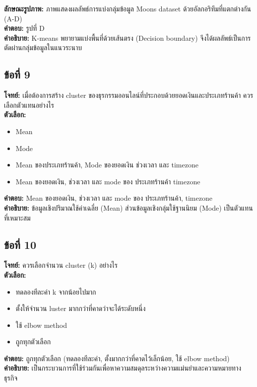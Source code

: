 \documentclass[12pt]{article}
\begin{document}
\textbf{ลักษณะรูปภาพ:} ภาพแสดงผลลัพธ์การแบ่งกลุ่มข้อมูล Moons dataset ด้วยอัลกอริทึมที่แตกต่างกัน (A-D)\\
\textbf{คำตอบ:} รูปที่ D\\
\textbf{คำอธิบาย:} K-means พยายามแบ่งพื้นที่ด้วยเส้นตรง (Decision boundary) จึงได้ผลลัพธ์เป็นการตัดผ่านกลุ่มข้อมูลในแนวระนาบ

\subsection*{ข้อที่ 9}
\textbf{โจทย์:} เมื่อต้องการสร้าง cluster ของธุรกรรมออนไลน์ที่ประกอบด้วยยอดเงินและประเภทร้านค้า ควรเลือกตัวแทนอย่างไร\\
\textbf{ตัวเลือก:}
\begin{itemize}
    \item Mean
    \item Mode
    \item Mean ของประเภทร้านค้า, Mode ของยอดเงิน ช่วงเวลา และ timezone
    \item Mean ของยอดเงิน, ช่วงเวลา และ mode ของ ประเภทร้านค้า timezone
\end{itemize}

\textbf{คำตอบ:} Mean ของยอดเงิน, ช่วงเวลา และ mode ของ ประเภทร้านค้า, timezone\\
\textbf{คำอธิบาย:} ข้อมูลเชิงปริมาณใช้ค่าเฉลี่ย (Mean) ส่วนข้อมูลเชิงกลุ่มใช้ฐานนิยม (Mode) เป็นตัวแทนที่เหมาะสม

\subsection*{ข้อที่ 10}
\textbf{โจทย์:} ควรเลือกจำนวน cluster (k) อย่างไร\\
\textbf{ตัวเลือก:}
\begin{itemize}
    \item ทดลองทีละค่า k จากน้อยไปมาก
    \item ตั้งให้จำนวน luster มากกว่าที่คาดว่าจะได้ระดับหนึ่ง
    \item ใช้ elbow method
    \item ถูกทุกตัวเลือก
\end{itemize}

\textbf{คำตอบ:} ถูกทุกตัวเลือก (ทดลองทีละค่า, ตั้งมากกว่าที่คาดไว้เล็กน้อย, ใช้ elbow method)\\
\textbf{คำอธิบาย:} เป็นกระบวนการที่ใช้ร่วมกันเพื่อหาความสมดุลระหว่างความแม่นยำและความหมายทางธุรกิจ
\end{document}
